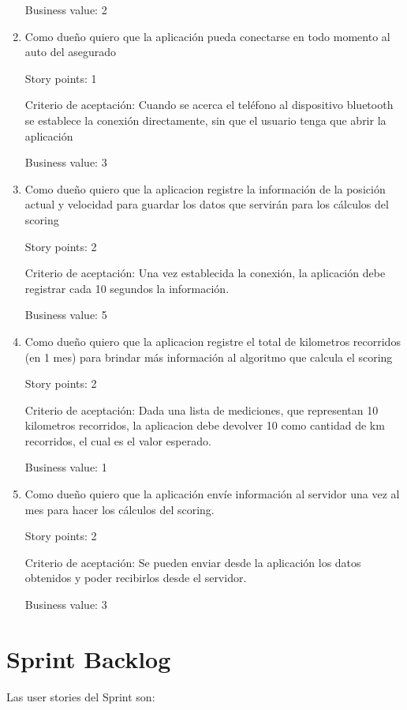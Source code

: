 \begin{enumerate}
Business value: 2


\item Como dueño quiero que la aplicación pueda conectarse en todo momento al auto del asegurado

Story points: 1

Criterio de aceptación:
Cuando se acerca el teléfono al dispositivo bluetooth se establece la conexión directamente, sin que el usuario tenga que abrir la aplicación

Business value: 3


\item Como dueño quiero que la aplicacion registre la información de la posición actual y velocidad para guardar los datos que servirán para los cálculos del scoring

Story points: 2

Criterio de aceptación:
Una vez establecida la conexión, la aplicación debe registrar cada 10 segundos la información.

Business value: 5

\item Como dueño quiero que la aplicacion registre el total de kilometros recorridos (en 1 mes) para brindar más información al algoritmo que calcula el scoring

Story points: 2

Criterio de aceptación:
Dada una lista de mediciones, que representan 10 kilometros recorridos, la aplicacion debe devolver 10 como cantidad de km recorridos, el cual es el valor esperado.

Business value: 1


\item Como dueño quiero que la aplicación envíe información al servidor una vez al mes para hacer los cálculos del scoring.

Story points: 2

Criterio de aceptación:
Se pueden enviar desde la aplicación los datos obtenidos y poder recibirlos desde el servidor.

Business value: 3

\end{enumerate}

\section{Sprint Backlog}

Las user stories del Sprint son:

